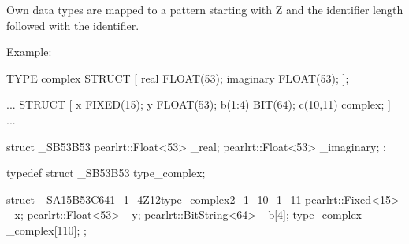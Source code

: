 Own data types are mapped to a pattern starting with Z and the identifier
 length followed with the identifier.

Example:
\begin{PEARLCode}
TYPE complex STRUCT [
     real FLOAT(53);
     imaginary FLOAT(53);
];

... STRUCT [ 
    x FIXED(15);
    y FLOAT(53);
    b(1:4) BIT(64);
    c(10,11) complex;
    ] ...

\end{PEARLCode}

\begin{CppCode}
struct _SB53B53 {
   pearlrt::Float<53> _real;
   pearlrt::Float<53> _imaginary;
};

typedef struct _SB53B53 type_complex; 

struct _SA15B53C641_1_4Z12type_complex2_1_10_1_11
{
   pearlrt::Fixed<15> _x;
   pearlrt::Float<53> _y;
   pearlrt::BitString<64> _b[4];
   type_complex _complex[110];
};


\end{CppCode}

